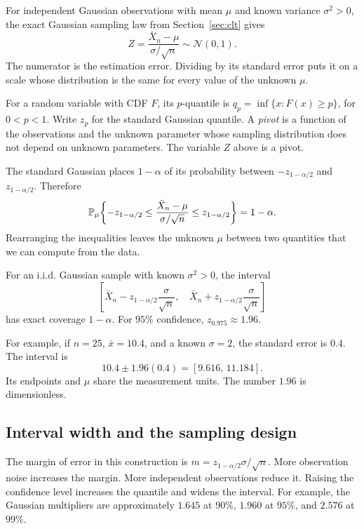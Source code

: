 For independent Gaussian observations with mean \(\mu\) and known
variance \(\sigma^2>0\), the exact Gaussian sampling law from
Section~\ref{sec:clt} gives
\[
  Z=\frac{\bar X_n-\mu}{\sigma/\sqrt n}\sim\mathcal N(0,1).
\]
The numerator is the estimation error. Dividing by its standard error
puts it on a scale whose distribution is the same for every value of
the unknown \(\mu\).

\begin{definition}
For a random variable with CDF \(F\), its \(p\)-quantile is
\(q_p=\inf\{x:F(x)\ge p\}\), for \(0<p<1\).
Write \(z_p\) for the standard Gaussian quantile.
A \emph{pivot} is a function of the observations and the unknown
parameter whose sampling distribution does not depend on unknown
parameters. The variable \(Z\) above is a pivot.
\end{definition}

The standard Gaussian places \(1-\alpha\) of its probability between
\(-z_{1-\alpha/2}\) and \(z_{1-\alpha/2}\). Therefore
\[
  \mathbb{P}_\mu\!\left\{
  -z_{1-\alpha/2}\le\frac{\bar X_n-\mu}{\sigma/\sqrt n}
  \le z_{1-\alpha/2}\right\}=1-\alpha.
\]
Rearranging the inequalities leaves the unknown \(\mu\) between
two quantities that we can compute from the data.

\begin{result}
For an i.i.d. Gaussian sample with known \(\sigma^2>0\), the interval
\[
  \left[\bar X_n-z_{1-\alpha/2}\frac{\sigma}{\sqrt n},\quad
        \bar X_n+z_{1-\alpha/2}\frac{\sigma}{\sqrt n}\right]
\]
has exact coverage \(1-\alpha\). For \(95\%\) confidence,
\(z_{0.975}\approx1.96\).
\end{result}

For example, if \(n=25\), \(\bar x=10.4\), and a known
\(\sigma=2\), the standard error is \(0.4\). The interval is
\[
  10.4\pm1.96(0.4)=[9.616,\,11.184].
\]
Its endpoints and \(\mu\) share the measurement units.
The number \(1.96\) is dimensionless.

\subsection{Interval width and the sampling design}

The margin of error in this construction is
\(m=z_{1-\alpha/2}\sigma/\sqrt n\). More observation noise increases
the margin. More independent observations reduce it. Raising the
confidence level increases the quantile and widens the interval.
For example, the Gaussian multipliers are approximately \(1.645\)
at \(90\%\), \(1.960\) at \(95\%\), and \(2.576\) at \(99\%\).

